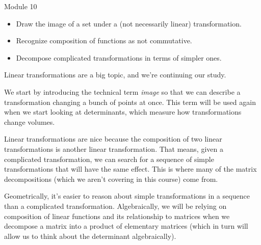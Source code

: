 \documentclass{workbook}
\begin{document}
\begin{lesson}

	Module 10

	\begin{itemize}
		\item Draw the image of a set under a (not necessarily linear) transformation.
		\item Recognize composition of functions as not commutative.
		\item Decompose complicated transformations in terms of simpler ones.
	\end{itemize}

		Linear transformations are a big topic, and we're continuing our study.

		We start by introducing the technical term \emph{image} so that we can describe
		a transformation changing a bunch of points at once. This term will be used again when
		we start looking at determinants, which measure how transformations change volumes.

		Linear transformations are nice because the composition of two linear transformations
		is another linear transformation. That means, given a complicated transformation, we can
		search for a sequence of simple transformations that will have the same effect. This is
		where many of the matrix decompositions (which we aren't covering in this course) come from.

		Geometrically, it's easier to reason about simple transformations in a sequence than a complicated
		transformation. Algebraically, we will be relying on composition of linear functions and its relationship
		to matrices when we decompose a matrix into a product of elementary matrices (which in turn will
		allow us to think about the determinant algebraically).
\end{lesson}
\end{document}
